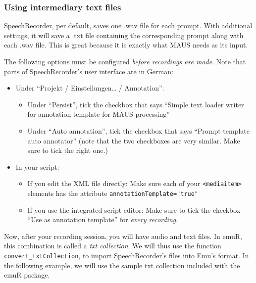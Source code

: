 \documentclass[]{book}
\providecommand{\tightlist}{%
  \setlength{\itemsep}{0pt}\setlength{\parskip}{0pt}}
\theoremstyle{definition}
\theoremstyle{definition}
\theoremstyle{definition}
\theoremstyle{remark}
\begin{document}
\subsubsection{Using intermediary text
files}\label{using-intermediary-text-files}

SpeechRecorder, per default, saves one .wav file for each prompt. With
additional settings, it will save a .txt file containing the
corresponding prompt along with each .wav file. This is great because it
is exactly what MAUS needs as its input.

The following options must be configured \emph{before recordings are
made}. Note that parts of SpeechRecorder's user interface are in German:

\begin{itemize}
\tightlist
\item
  Under ``Projekt / Einstellungen\ldots{} / Annotation'':

  \begin{itemize}
  \tightlist
  \item
    Under ``Persist'', tick the checkbox that says ``Simple text loader
    writer for annotation template for MAUS processing''
  \item
    Under ``Auto annotation'', tick the checkbox that says ``Prompt
    template auto annotator'' (note that the two checkboxes are very
    similar. Make sure to tick the right one.)
  \end{itemize}
\item
  In your script:

  \begin{itemize}
  \tightlist
  \item
    If you edit the XML file directly: Make sure each of your
    \texttt{\textless{}mediaitem\textgreater{}} elements has the
    attribute \texttt{annotationTemplate="true"}
  \item
    If you use the integrated script editor: Make sure to tick the
    checkbox ``Use as annotation template'' for \emph{every recording}.
  \end{itemize}
\end{itemize}

Now, after your recording session, you will have audio and text files.
In emuR, this combination is called a \emph{txt collection}. We will
thus use the function \texttt{convert\_txtCollection}, to import
SpeechRecorder's files into Emu's format. In the following example, we
will use the sample txt collection included with the emuR package.
\end{document}
